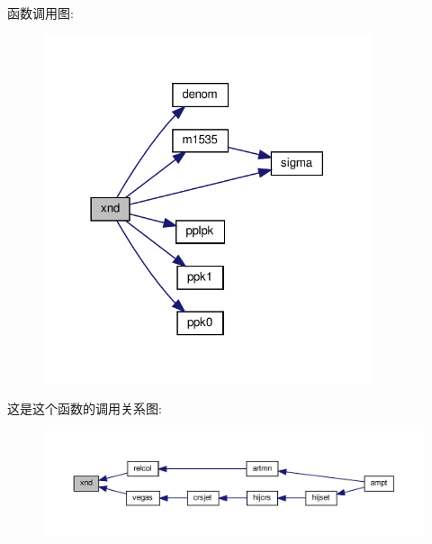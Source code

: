 函数调用图\+:
\nopagebreak
\begin{figure}[H]
\begin{center}
\leavevmode
\includegraphics[width=273pt]{xnd_8f90_a5c2e7f2d4a97300946911f9008c772ee_cgraph}
\end{center}
\end{figure}
这是这个函数的调用关系图\+:
\nopagebreak
\begin{figure}[H]
\begin{center}
\leavevmode
\includegraphics[width=350pt]{xnd_8f90_a5c2e7f2d4a97300946911f9008c772ee_icgraph}
\end{center}
\end{figure}
